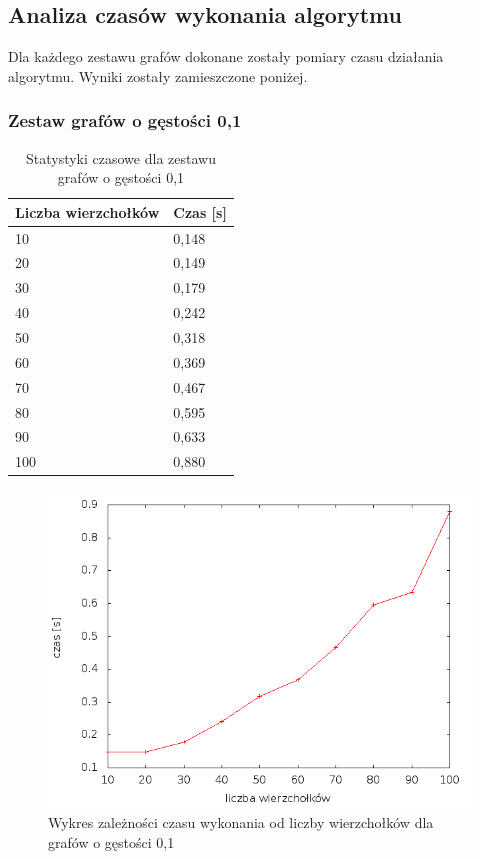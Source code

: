 \documentclass[12pt, a4paper]{article}
\begin{document}
\subsection{Analiza czasów wykonania algorytmu}
\label{testy}
Dla każdego zestawu grafów dokonane zostały pomiary czasu działania algorytmu. Wyniki zostały zamieszczone poniżej.
\newpage
\subsubsection*{Zestaw grafów o gęstości 0,1}
\begin{table}[H]
\caption{Statystyki czasowe dla zestawu grafów o gęstości 0,1}
\begin{center}
    \begin{tabular}{|l|l|}
    \hline
    Liczba wierzchołków & Czas [s] \\ \hline
    10 & 0,148 \\ \hline
    20 & 0,149 \\ \hline
    30 & 0,179 \\ \hline
    40 & 0,242 \\ \hline
    50 & 0,318 \\ \hline
    60 & 0,369 \\ \hline
    70 & 0,467 \\ \hline
    80 & 0,595 \\ \hline
    90 & 0,633 \\ \hline
    100 & 0,880 \\ \hline
    \end{tabular}
\end{center}
\end{table}

\begin{figure}[h]
    \begin{center}
	\includegraphics[scale=0.5]{results/img/den/den_01.png}
	\caption{Wykres zależności czasu wykonania od liczby wierzchołków dla grafów o gęstości 0,1}
    \end{center}
\end{figure}
\end{document}
